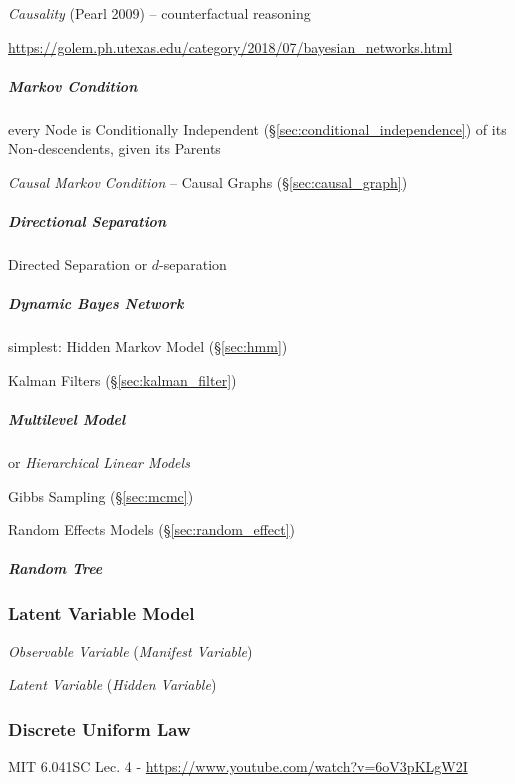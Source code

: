 \emph{Causality} (Pearl 2009) -- counterfactual reasoning

\url{https://golem.ph.utexas.edu/category/2018/07/bayesian_networks.html}



\subparagraph{Markov Condition}\label{sec:markov_condition}\hfill

every Node is Conditionally Independent (\S\ref{sec:conditional_independence})
of its Non-descendents, given its Parents

\emph{Causal Markov Condition}
--
Causal Graphs (\S\ref{sec:causal_graph})



\subparagraph{Directional Separation}\label{sec:directional_separation}\hfill

Directed Separation or $d$-separation



\subparagraph{Dynamic Bayes Network}\label{sec:dynamic_bayes_network}\hfill

simplest: Hidden Markov Model (\S\ref{sec:hmm})

Kalman Filters (\S\ref{sec:kalman_filter})



\subparagraph{Multilevel Model}\label{sec:multilevel_model}\hfill

or \emph{Hierarchical Linear Models}

Gibbs Sampling (\S\ref{sec:mcmc})

Random Effects Models (\S\ref{sec:random_effect})



\subparagraph{Random Tree}\label{sec:random_tree}\hfill



\subsubsection{Latent Variable Model}\label{sec:latent_variable_model}

\emph{Observable Variable} (\emph{Manifest Variable})

\emph{Latent Variable} (\emph{Hidden Variable})



\subsubsection{Discrete Uniform Law}\label{sec:discrete_uniform_law}

MIT 6.041SC Lec. 4 - \url{https://www.youtube.com/watch?v=6oV3pKLgW2I}

